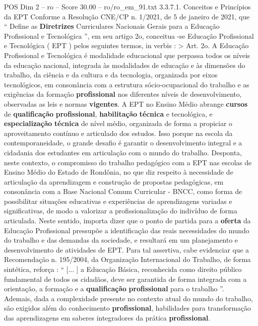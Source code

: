 \begin{textsample}{POS Dim 2 – ro – Score 30.00 – ro/ro\_em\_91.txt}  \label{ex:f2_pos_183}
3.3.7.1.
Conceitos e Princípios da EPT Conforme a Resolução CNE/CP n. 1/2021, de 5 de janeiro de 2021, que “ Define as \textbf{Diretrizes} Curriculares Nacionais Gerais para a Educação Profissional e Tecnológica ”, em seu artigo 2o, conceitua -se Educação Profissional e Tecnológica ( EPT ) pelos seguintes termos, in verbis : > Art. 2o.
A Educação Profissional e Tecnológica é modalidade educacional que perpassa todos os níveis da educação nacional, integrada às modalidades de educação e às dimensões do trabalho, da ciência e da cultura e da tecnologia, organizada por eixos tecnológicos, em consonância com a estrutura sócio-ocupacional do trabalho e as exigências da formação \textbf{profissional} nos diferentes níveis de desenvolvimento, observadas as leis e normas \textbf{vigentes}.
A EPT no Ensino Médio abrange \textbf{cursos} de \textbf{qualificação} \textbf{profissional}, \textbf{habilitação} \textbf{técnica} e tecnológica, e \textbf{especialização} \textbf{técnica} de nível médio, organizada de forma a propiciar o aproveitamento contínuo e articulado dos estudos.
Isso porque na escola da contemporaneidade, o grande desafio é garantir o desenvolvimento integral e a cidadania dos estudantes em articulação com o mundo do trabalho.
Desponta, neste contexto, o compromisso do trabalho pedagógico com a EPT nas escolas de Ensino Médio do Estado de Rondônia, no que diz respeito à necessidade de articulação da aprendizagem e construção de propostas pedagógicas, em consonância com a Base Nacional Comum Curricular - BNCC, como forma de possibilitar situações educativas e experiências de aprendizagens variadas e significativas, de modo a valorizar a profissionalização do indivíduo de forma articulada.
Neste sentido, importa dizer que o ponto de partida para a \textbf{oferta} da Educação Profissional pressupõe a identificação das reais necessidades do mundo do trabalho e das demandas da sociedade, e resultará em um planejamento e desenvolvimento de atividades de EPT.
Para tal assertiva, cabe evidenciar que a Recomendação n. 195/2004, da Organização Internacional do Trabalho, de forma sintética, reforça : “ [... ] a Educação Básica, reconhecida como direito público fundamental de todos os cidadãos, deve ser garantida de forma integrada com a orientação, a formação e a \textbf{qualificação} \textbf{profissional} para o trabalho ”.
Ademais, dada a complexidade presente no contexto atual do mundo do trabalho, são exigidos além do conhecimento \textbf{profissional}, habilidades para transformação das aprendizagens em saberes integradores da prática \textbf{profissional}.

\end{textsample}
